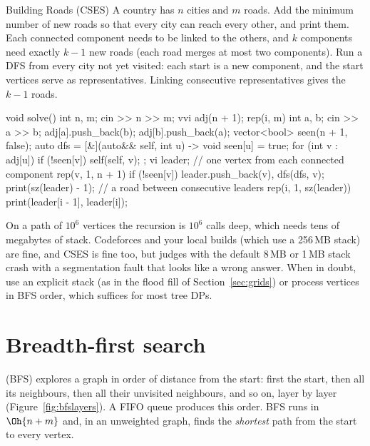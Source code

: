 \begin{problem}{Building Roads (CSES)}
A country has $n$ cities and $m$ roads. Add the minimum number of new roads so that every city can reach every other, and
print them.
\solution Each connected component needs to be linked to the others, and $k$ components need exactly $k - 1$ new roads (each
road merges at most two components). Run a DFS from every city not yet visited: each start is a new component, and the start
vertices serve as representatives. Linking consecutive representatives gives the $k - 1$ roads.
\end{problem}

\begin{code}
void solve() {
    int n, m;
    cin >> n >> m;
    vvi adj(n + 1);
    rep(i, m) {
        int a, b;
        cin >> a >> b;
        adj[a].push_back(b);
        adj[b].push_back(a);
    }
    vector<bool> seen(n + 1, false);
    auto dfs = [&](auto&& self, int u) -> void {
        seen[u] = true;
        for (int v : adj[u])
            if (!seen[v]) self(self, v);
    };
    vi leader;  // one vertex from each connected component
    rep(v, 1, n + 1) if (!seen[v]) leader.push_back(v), dfs(dfs, v);
    print(sz(leader) - 1);  // a road between consecutive leaders
    rep(i, 1, sz(leader)) print(leader[i - 1], leader[i]);
}
\end{code}


\begin{pitfall}
On a path of $10^6$ vertices the recursion is $10^6$ calls deep, which needs tens of megabytes of stack. Codeforces and your
local builds (which use a 256\,MB stack) are fine, and CSES is fine too, but judges with the default 8\,MB or 1\,MB stack
crash with a segmentation fault that looks like a wrong answer. When in doubt, use an explicit stack (as in the flood fill of
Section~\ref{sec:grids}) or process vertices in BFS order, which suffices for most tree DPs.
\end{pitfall}

\section[Breadth-first search]{Breadth-first search \hfill \silver}\label{sec:bfs}

 (BFS) explores a graph in order of distance from the start: first the start, then all its
neighbours, then all their unvisited neighbours, and so on, layer by layer (Figure~\ref{fig:bfslayers}). A FIFO queue
produces this order. BFS runs in $\Oh{n + m}$ and, in an unweighted graph, finds the \emph{shortest} path from the start to
every vertex.

